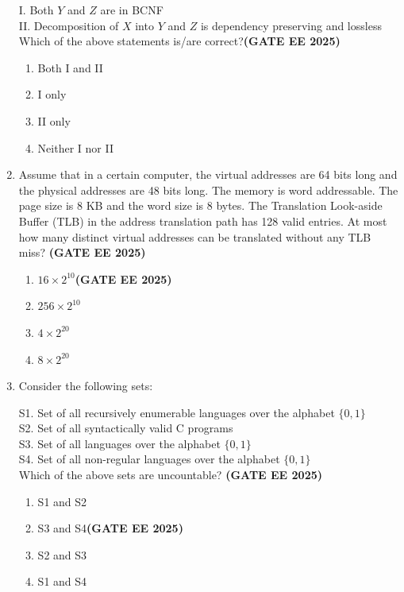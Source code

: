 \documentclass[journal,12pt,onecolumn]{IEEEtran}
\theoremstyle{remark}
\begin{document}
\begin{enumerate}
I. Both $Y$ and $Z$ are in BCNF  \\
II. Decomposition of $X$ into $Y$ and $Z$ is dependency preserving and lossless \\  

Which of the above statements is/are correct?\hfill \textbf{(GATE EE 2025)}  

\begin{enumerate}
  \item   Both I and II
  \item   I only
  \item   II only
  \item   Neither I nor II
\end{enumerate}

\item  Assume that in a certain computer, the virtual addresses are 64 bits long and the physical addresses are 48 bits long. The memory is word addressable. The page size is 8 KB and the word size is 8 bytes. The Translation Look-aside Buffer (TLB) in the address translation path has 128 valid entries. At most how many distinct virtual addresses can be translated without any TLB miss?  \hfill \textbf{(GATE EE 2025)}

\begin{enumerate}
  \item   $16 \times 2^{10}$\hfill \textbf{(GATE EE 2025)}
  \item   $256 \times 2^{10}$
  \item   $4 \times 2^{20}$
  \item   $8 \times 2^{20}$
\end{enumerate}


\item  Consider the following sets:  

S1. Set of all recursively enumerable languages over the alphabet $\{0,1\}$ \\
S2. Set of all syntactically valid C programs\\
S3. Set of all languages over the alphabet $\{0,1\}$ \\
S4. Set of all non-regular languages over the alphabet $\{0,1\}$ \\

Which of the above sets are uncountable?  \hfill \textbf{(GATE EE 2025)}

\begin{enumerate}
  \item   S1 and S2
  \item   S3 and S4\hfill \textbf{(GATE EE 2025)}
  \item   S2 and S3
  \item   S1 and S4
\end{enumerate}



\end{enumerate}
\end{document}
